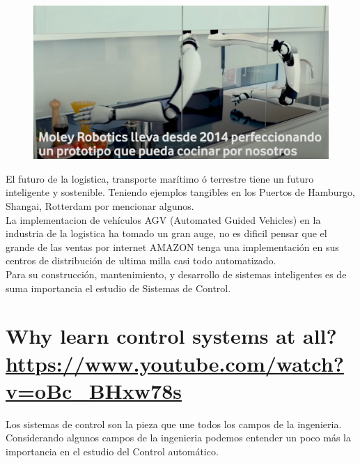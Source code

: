 \documentclass[
	12pt, %
]{fphw}
\begin{document}
\begin{figure}[H]
  \centering
  \includegraphics[scale=0.4]{images/hard.png}
\end{figure}

El futuro de la logistica, transporte marítimo ó terrestre tiene un futuro inteligente y sostenible. Teniendo ejemplos tangibles en los Puertos de Hamburgo, Shangai, Rotterdam por mencionar algunos.\\

La implementacion de vehículos AGV (Automated Guided Vehicles) en la industria de la logistica ha tomado un gran auge, no es dificil pensar que el grande de las ventas por internet AMAZON tenga una implementación en sus centros de distribución de ultima milla casi todo automatizado.\\

Para su construcción, mantenimiento, y desarrollo de sistemas inteligentes es de suma importancia el estudio de Sistemas de Control.

\newpage
\section*{{\color{Apricot}Why learn control systems at all?} \url{https://www.youtube.com/watch?v=oBc_BHxw78s}}

Los sistemas de control son la pieza que une todos los campos de la ingenieria.\\

Considerando algunos campos de la ingenieria podemos entender un poco más la importancia en el estudio del Control automático.
\end{document}
